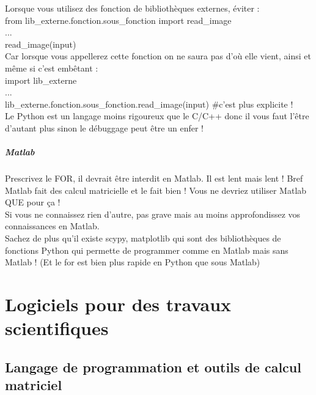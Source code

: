 \documentclass[a4paper,10pt]{book_ad}
\begin{document}
Lorsque vous utilisez des fonction de bibliothèques externes, éviter : \\

from lib\_externe.fonction.sous\_fonction import read\_image \\
...\\
read\_image(input)\\

Car lorsque vous appellerez cette fonction on ne saura pas d'où elle vient, ainsi et même si 
c'est embêtant : \\

import lib\_externe \\
...\\
lib\_externe.fonction.sous\_fonction.read\_image(input) \#c'est plus explicite !\\

Le Python est un langage moins rigoureux que le C/C++ donc il vous faut l'être d'autant plus
 sinon le débuggage peut être un enfer ! \\

\paragraph{Matlab}

Prescrivez le FOR, il devrait être interdit en Matlab. Il est lent mais lent ! Bref Matlab 
fait des calcul matricielle et le fait bien ! Vous ne devriez utiliser Matlab QUE pour ça !\\

Si vous ne connaissez rien d'autre, pas grave mais au moins approfondissez vos connaissances 
en Matlab.\\

Sachez de plus qu'il existe scypy, matplotlib  qui sont des bibliothèques de fonctions Python 
qui permette de programmer comme en Matlab mais sans Matlab ! (Et le for est bien plus rapide 
en Python que sous Matlab)\\


 

\chapter{Logiciels pour des  travaux scientifiques}
\minitoc

\section{Langage de programmation et outils de calcul matriciel}
\end{document}
